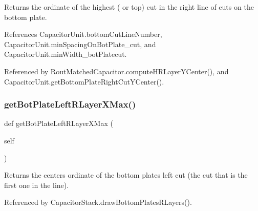 \begin{DoxyReturn}{Returns}
the ordinate of the highest ( or top) cut in the right line of cuts on the bottom plate. 
\end{DoxyReturn}


References Capacitor\+Unit.\+bottom\+Cut\+Line\+Number, Capacitor\+Unit.\+min\+Spacing\+On\+Bot\+Plate\+\_\+cut, and Capacitor\+Unit.\+min\+Width\+\_\+bot\+Platecut.



Referenced by Rout\+Matched\+Capacitor.\+compute\+H\+R\+Layer\+Y\+Center(), and Capacitor\+Unit.\+get\+Bottom\+Plate\+Right\+Cut\+Y\+Center().

\mbox{\label{classpython_1_1capacitorunit_1_1CapacitorUnit_a8f1e061c67e1794bf35624c57e75c5b7}} 
\subsubsection{\texorpdfstring{get\+Bot\+Plate\+Left\+R\+Layer\+X\+Max()}{getBotPlateLeftRLayerXMax()}}
{\footnotesize\ttfamily def get\+Bot\+Plate\+Left\+R\+Layer\+X\+Max (\begin{DoxyParamCaption}\item[{}]{self }\end{DoxyParamCaption})}

\begin{DoxyReturn}{Returns}
the center\textquotesingle{}s ordinate of the bottom plate\textquotesingle{}s left cut (the cut that is the first one in the line). 
\end{DoxyReturn}


Referenced by Capacitor\+Stack.\+draw\+Bottom\+Plates\+R\+Layers().

\mbox{\label{classpython_1_1capacitorunit_1_1CapacitorUnit_aed67ac964dc5d63b17a36e6a13a09b03}} 
